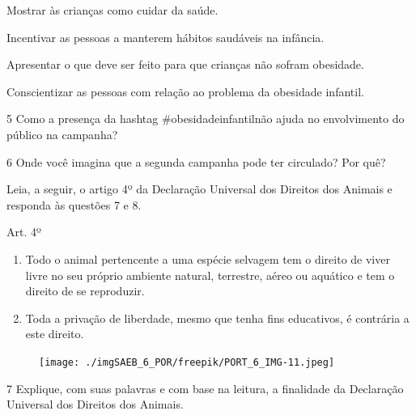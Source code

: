 \begin{escolha}
\item Mostrar às crianças como cuidar da saúde.
\item Incentivar as pessoas a manterem hábitos saudáveis na infância.
\item Apresentar o que deve ser feito para que crianças não sofram
obesidade.
\item Conscientizar as pessoas com relação ao problema da obesidade
infantil. 
\end{escolha}


\num{5} Como a presença da hashtag \#obesidadeinfantilnão ajuda no
envolvimento do público na campanha?


\num{6} Onde você imagina que a segunda campanha pode ter circulado? Por
quê?


Leia, a seguir, o artigo 4º da Declaração Universal dos Direitos dos
Animais e responda às questões 7 e 8.

\begin{myquote}
Art. 4º
\begin{enumerate}
\item Todo o animal pertencente a uma espécie selvagem tem o direito de
viver livre no seu próprio ambiente natural, terrestre, aéreo ou
aquático e tem o direito de se reproduzir.
\item Toda a privação de liberdade, mesmo que tenha fins educativos, é
contrária a este direito.
\end{enumerate}

\begin{figure}[H]
\centering\texttt{[image: ./imgSAEB\_6\_POR/freepik/PORT\_6\_IMG-11.jpeg]}
\end{figure}

\end{myquote}

\num{7} Explique, com suas palavras e com base na leitura, a finalidade
da Declaração Universal dos Direitos dos Animais.

